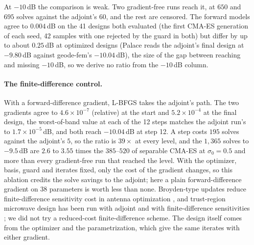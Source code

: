\documentclass{anvil-paper}
\begin{document}
At $-10$\,dB the comparison is weak. Two gradient-free runs reach it, at
$650$ and $695$ solves against the adjoint's $60$, and the rest are
censored. The forward models agree to $0.004$\,dB on the 41 designs
both evaluated (the first CMA-ES generation of each seed, 42 samples with
one rejected by the guard in both) but differ by up to about $0.25$\,dB at
optimized designs (Palace reads the adjoint's final design at $-9.80$\,dB
against geode-fem's $-10.04$\,dB), the size of the gap between reaching and
missing $-10$\,dB, so we derive no ratio from the $-10$\,dB column.

\paragraph{The finite-difference control.}
With a forward-difference gradient, L-BFGS takes the adjoint's path. The two
gradients agree to $4.6\times10^{-7}$ (relative) at the start and
$5.2\times10^{-4}$ at the final design, the worst-of-band value at each of
the 12 steps matches the adjoint run's to $1.7\times10^{-5}$\,dB, and both
reach $-10.04$\,dB at step 12. A step costs $195$ solves against the
adjoint's $5$, so the ratio is $39\times$ at every level, and the $1{,}365$
solves to $-9.5$\,dB are $2.6$ to $3.55$ times the $385$--$520$ of separable
CMA-ES at $\sigma_0 = 0.5$ and more than every gradient-free run that
reached the level. With the optimizer, basis, guard and iterates fixed, only
the cost of the gradient changes, so this ablation credits the solve savings
to the adjoint; here a plain forward-difference gradient on 38 parameters is
worth less than none. Broyden-type updates reduce finite-difference
sensitivity cost in antenna optimization \citep{koziel2020expedited}, and
trust-region microwave design has been run with adjoint and with
finite-difference sensitivities \citep{koziel2012robust}; we did not try a
reduced-cost finite-difference scheme. The design itself comes from the optimizer and the
parametrization, which give the same iterates with either gradient.
\end{document}
